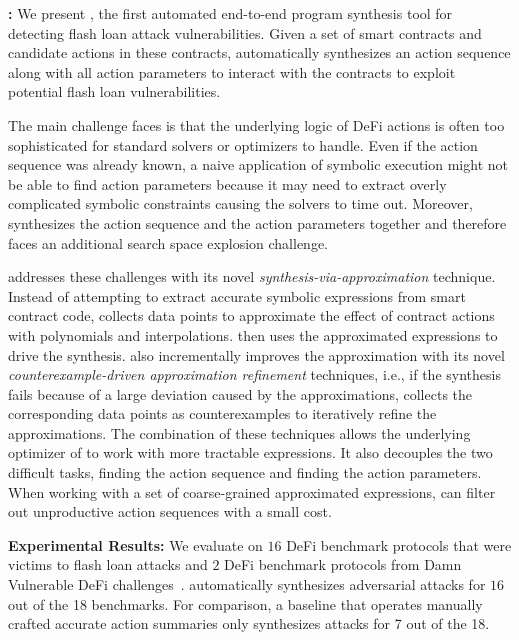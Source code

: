 \noindent \textbf{\name:}
We present {\name}, the first automated end-to-end program synthesis
tool for detecting flash loan attack vulnerabilities. Given a set of smart
contracts and candidate actions in these contracts, {\name} automatically
synthesizes an action sequence along with all action parameters to interact
with the contracts to exploit potential flash loan vulnerabilities.

The main challenge {\name} faces is that the underlying logic of DeFi actions
is often too sophisticated for standard solvers or optimizers to handle. Even
if the action sequence was already known, a naive application of symbolic
execution might not be able to find action parameters because it may need to extract
overly complicated symbolic constraints causing the solvers to
time out. Moreover, {\name} synthesizes the action sequence and the action
parameters together and therefore faces an additional search space explosion
challenge.

{\name} addresses these challenges with its novel
\emph{synthesis-via-approximation} technique. Instead of attempting to extract
accurate symbolic expressions from smart contract code, {\name} collects data
points to approximate the effect of contract actions with polynomials and
interpolations. {\name} then uses the approximated expressions to drive the
synthesis. {\name} also incrementally improves the approximation with its novel
\emph{counterexample-driven approximation refinement} techniques, i.e., if the
synthesis fails because of a large deviation caused by the approximations,
{\name} collects the corresponding data points as counterexamples to
iteratively refine the approximations. The combination of these techniques
allows the underlying optimizer of {\name} to work with more tractable
expressions. It also decouples the two difficult tasks, finding the action
sequence and finding the action parameters. When working with a set of
coarse-grained approximated expressions, {\name} can filter out unproductive
action sequences with a small cost.

\noindent \textbf{Experimental Results:} 
We evaluate {\name} on $16$ DeFi benchmark protocols that were victims to flash
loan attacks and $2$ DeFi benchmark protocols from Damn Vulnerable DeFi
challenges~\cite{DVD}. {\name} automatically synthesizes adversarial attacks for $16$ out
of the 18 benchmarks. For comparison, a baseline that operates manually crafted
accurate action summaries only synthesizes attacks for 7 out of the 18.

